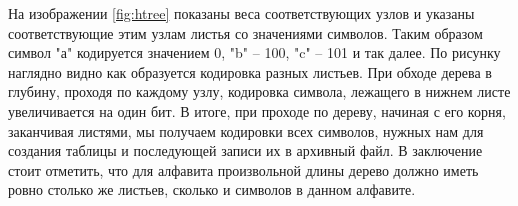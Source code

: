 На изображении \ref{fig:htree} показаны веса соответствующих узлов и указаны соответствующие этим узлам листья со значениями символов.
Таким образом символ "а" кодируется значением 0, "b" -- 100, "c" -- 101 и так далее. 
По рисунку наглядно видно как образуется кодировка разных листьев. 
При обходе дерева в глубину, проходя по каждому узлу, кодировка символа, лежащего в нижнем листе увеличивается на один бит.
В итоге, при проходе по дереву, начиная с его корня, заканчивая листями, мы получаем кодировки всех символов, нужных нам для создания таблицы и последующей записи их в архивный файл.
В заключение стоит отметить, что для алфавита произвольной длины дерево должно иметь ровно столько же листьев, сколько и символов в данном алфавите.